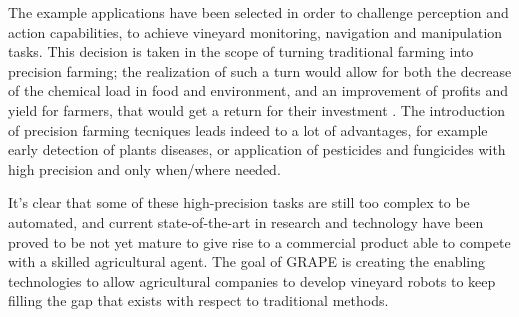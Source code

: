 The example applications have been selected in order to challenge perception and action capabilities, to achieve vineyard monitoring, navigation and manipulation tasks. This decision is taken in the scope of turning traditional farming into precision farming; the realization of such a turn would allow for both the decrease of the chemical load in food and environment, and an improvement of profits and yield for farmers, that would get a return for their investment \parencite{precisionFarming}. The introduction of precision farming tecniques leads indeed to a lot of advantages, for example early detection of plants diseases, or application of pesticides and fungicides with high precision and only when/where needed.

It's clear that some of these high-precision tasks are still too complex to be automated, and current state-of-the-art in research and technology have been proved to be not yet mature to give rise to a commercial product able to compete with a skilled agricultural agent. The goal of \ac{GRAPE} is creating the enabling technologies to allow agricultural companies to develop vineyard robots to keep filling the gap that exists with respect to traditional methods.

